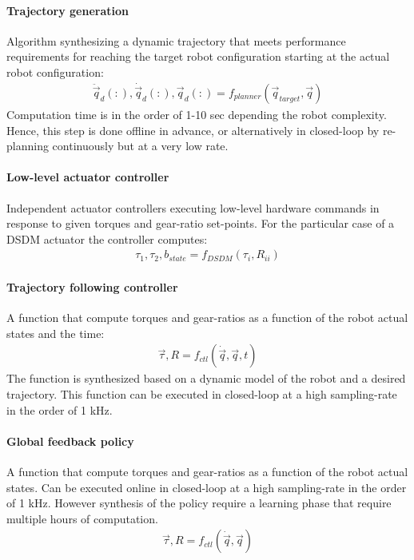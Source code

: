 \paragraph{Trajectory generation} Algorithm synthesizing a dynamic trajectory that meets performance requirements for reaching the target robot configuration starting at the actual robot configuration: 
%
\begin{align}
  \ddot{\vec{q}}_d(:),\dot{\vec{q}}_d(:),\vec{q}_d(:) = f_{planner}(\vec{q}_{target}, \vec{q})
	\label{eq:trajgen}
\end{align}
%
Computation time is in the order of 1-10 sec depending the robot complexity. Hence, this step is done offline in advance, or alternatively in closed-loop by re-planning continuously but at a very low rate. 

\paragraph{Low-level actuator controller} Independent actuator controllers executing low-level hardware commands in response to given torques and gear-ratio set-points. For the particular case of a DSDM actuator the controller computes:
%
\begin{align}
  \tau_1 , \tau_2 , b_{state} = f_{DSDM}(\tau_i, R_{ii})
	\label{eq:low-level-dsdm}
\end{align}
%

\paragraph{Trajectory following controller} A function that compute torques and gear-ratios as a function of the robot actual states and the time:
%
\begin{align}
  \vec{\tau}, R = f_{ctl}(\dot{\vec{q}}, \vec{q} , t)
	\label{eq:trajctl}
\end{align}
%
 The function is synthesized based on a dynamic model of the robot and a desired trajectory. This function can be executed in closed-loop at a high sampling-rate in the order of 1 kHz.

\paragraph{Global feedback policy} A function that compute torques and gear-ratios as a function of the robot actual states. Can be executed online in closed-loop at a high sampling-rate in the order of 1 kHz. However synthesis of the policy require a learning phase that require multiple hours of computation. 
%
\begin{align}
  \vec{\tau}, R = f_{ctl}(\dot{\vec{q}}, \vec{q})
	\label{eq:globctl}
\end{align}
%


